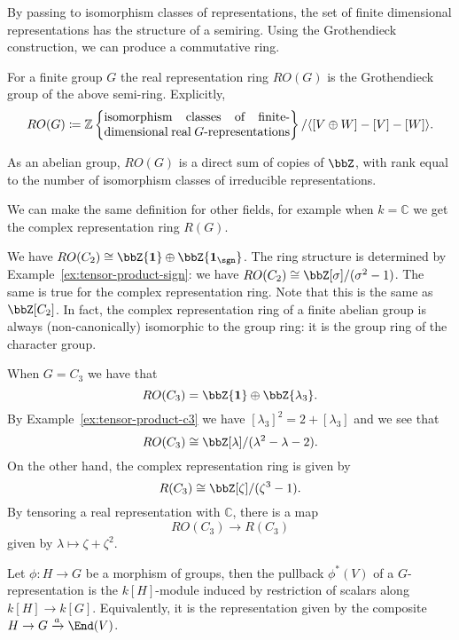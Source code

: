 \documentclass{willowtreebook}
\begin{document}
\begin{remark}
    By passing to isomorphism classes of representations, the set of finite dimensional representations has the structure of a semiring. Using the Grothendieck construction, we can produce a commutative ring. 
\end{remark}
\begin{definition}
    For a finite group $G$ the real representation ring $RO(G)$ is the Grothendieck group of the above semi-ring. Explicitly,
    \[
RO(G) \coloneqq \mathbb{Z}\left\{ \parbox{15em}{isomorphism classes of finite-dimensional real $G$-representations} \right\}/\langle [ V \oplus W] - [V] - [W] \rangle .
    \]
\end{definition}
\begin{remark}
    As an abelian group, $RO(G)$ is a direct sum of copies of $\bbZ$, with rank equal to the number of isomorphism classes of irreducible representations. 
\end{remark}
\begin{remark}
    We can make the same definition for other fields, for example when $k = \mathbb{C}$ we get the complex representation ring $R(G)$. 
\end{remark}
\begin{example}
    We have $RO(C_2) \cong \bbZ\{ \mathbf{1} \} \oplus \bbZ\{\mathbf{1}_{\sgn}\}$. The ring structure is determined by Example~\eqref{ex:tensor-product-sign}: we have $RO(C_2) \cong \bbZ[\sigma]/(\sigma^2-1)$. The same is true for the complex representation ring. Note that this is the same as $\bbZ[C_2]$. In fact, the complex representation ring of a finite abelian group is always (non-canonically) isomorphic to the group ring: it is the group ring of the character group. 
\end{example}
\begin{example}
    When $G = C_3$ we have that
    \[
RO(C_3) = \bbZ\{ \mathbf{1} \} \oplus \bbZ\{ \lambda_3 \}. 
    \]
    By Example~\eqref{ex:tensor-product-c3} we have $[\lambda_3]^2 = 2 + [\lambda_3]$ and we see that
    \[
RO(C_3) \cong \bbZ[\lambda]/(\lambda^2-\lambda-2). 
    \]
    On the other hand, the complex representation ring is given by \[
    R(C_3) \cong \bbZ[\zeta]/(\zeta^3-1).
    \]
    By tensoring a real representation with $\mathbb{C}$, there is a map
    \[
RO(C_3) \to R(C_3)
    \]
    given by $\lambda \mapsto \zeta + \zeta^2$. 
\end{example}
\begin{definition}
    Let $\phi \colon H \to G$ be a morphism of groups, then the pullback $\phi^*(V)$ of a $G$-representation is the $k[H]$-module induced by restriction of scalars along $k[H] \to k[G]$. Equivalently, it is the representation given by the composite $H \to G \xrightarrow{a} \End(V)$. 
\end{definition}
\end{document}
